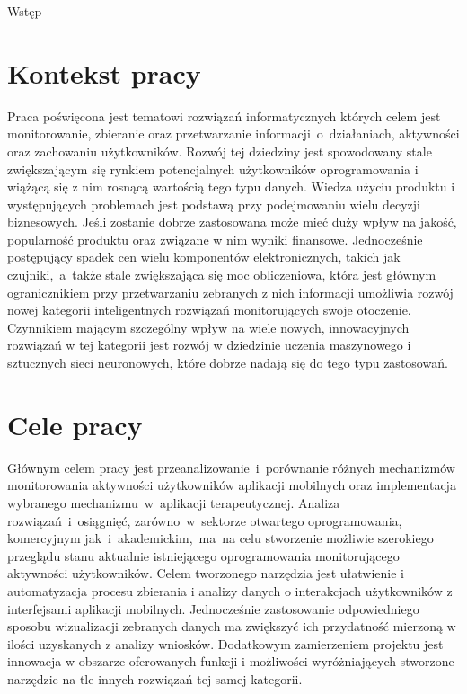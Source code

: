 \begin{chapter}{Wstęp}
	\newcommand{\chapterPath}{chapters/Introduction}

	\section{Kontekst pracy}
	Praca poświęcona jest tematowi rozwiązań informatycznych których celem jest monitorowanie, zbieranie oraz przetwarzanie informacji~o~działaniach, aktywności oraz zachowaniu użytkowników. Rozwój tej dziedziny jest spowodowany stale zwiększającym się rynkiem potencjalnych użytkowników oprogramowania i wiążącą się z nim rosnącą wartością tego typu danych. Wiedza użyciu produktu i występujących problemach jest podstawą przy podejmowaniu wielu decyzji biznesowych. Jeśli zostanie dobrze zastosowana może mieć duży wpływ na jakość, popularność produktu oraz związane w nim wyniki finansowe. Jednocześnie postępujący spadek cen wielu komponentów elektronicznych, takich jak czujniki,~a~także stale zwiększająca się moc obliczeniowa, która jest głównym ogranicznikiem  przy przetwarzaniu zebranych z nich informacji umożliwia rozwój nowej kategorii inteligentnych rozwiązań monitorujących swoje otoczenie. Czynnikiem mającym szczególny wpływ na wiele nowych, innowacyjnych rozwiązań w tej kategorii jest rozwój w dziedzinie uczenia maszynowego i sztucznych sieci neuronowych, które dobrze nadają się do tego typu zastosowań.
	
	\section{Cele pracy}
	Głównym celem pracy jest przeanalizowanie~i~porównanie różnych mechanizmów monitorowania aktywności użytkowników aplikacji mobilnych oraz implementacja wybranego mechanizmu~w~aplikacji terapeutycznej. Analiza rozwiązań~i~osiągnięć, zarówno~w~sektorze otwartego oprogramowania, komercyjnym jak~i~akademickim,~ma~na celu stworzenie możliwie szerokiego przeglądu stanu aktualnie istniejącego oprogramowania monitorującego aktywności użytkowników. Celem tworzonego narzędzia jest ułatwienie i automatyzacja procesu zbierania i analizy danych o interakcjach użytkowników z interfejsami aplikacji mobilnych. Jednocześnie zastosowanie odpowiedniego sposobu wizualizacji zebranych danych ma zwiększyć ich przydatność mierzoną w ilości uzyskanych z analizy wniosków. Dodatkowym zamierzeniem projektu jest innowacja w obszarze oferowanych funkcji i możliwości wyróżniających stworzone narzędzie na tle innych rozwiązań tej samej kategorii.
	

\end{chapter}
